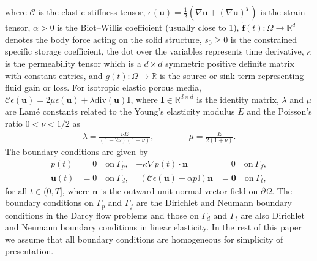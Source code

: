 \documentclass{amsart}
\begin{document}
where $\mathcal{C}$ is the elastic stiffness tensor, $\epsilon(\boldsymbol{u}) = \frac{1}{2}\left(\nabla \boldsymbol{u} + \left(\nabla \boldsymbol{u}\right)^{T}\right)$ is the strain tensor, $\alpha >0$ is the Biot--Willis coefficient (usually close to 1), $\tilde{\boldsymbol{f}}(t): \Omega \rightarrow \mathbb{R}^{d}$ denotes the body force acting on the solid structure, $s_{0} \ge 0$ is the constrained specific storage coefficient, the dot over the variables represents time derivative, $\kappa$ is the permeability tensor which is a $d\times d$ symmetric positive definite matrix with constant entries, and $g(t): \Omega \rightarrow \mathbb{R}$ is the source or sink term representing fluid gain or loss. For isotropic elastic porous media, $\boldsymbol{\mathcal{C}} \epsilon(\boldsymbol{u}) = 2\mu  \epsilon(\boldsymbol{u}) + \lambda \text{div}(\boldsymbol{u}) \boldsymbol{I}$,
where $\boldsymbol{I}\in \mathbb{R}^{d\times d}$ is the identity matrix, $\lambda$ and $\mu$ are Lam\'{e} constants related to the Young's elasticity modulus $E$ and the Poisson’s ratio $0<\nu<1/2$ as
\begin{align*}
	\lambda = \frac{\nu E}{(1-2\nu)(1+\nu)},\qquad \qquad \mu = \frac{E}{2(1+\nu)}.
\end{align*}
The boundary conditions are given by
\begin{align*}
	p(t) &=0 \quad \text{on} \ \Gamma_p, & -\kappa \nabla p(t) \cdot \boldsymbol{n}  &= 0 \quad \text{on} \ \Gamma_{f},
    \\
	\boldsymbol{u}(t) &=0 \quad \text{on} \ \Gamma_d, & \ \ (\mathcal{C} \epsilon(\boldsymbol{u}) - \alpha p \mathbb{I}) \boldsymbol{n} &= \boldsymbol{0} \quad \text{on} \ \Gamma_t,
\end{align*}
for all $t \in (0,T]$, where $\boldsymbol{n}$ is the outward unit normal vector field on $\partial \Omega$. The boundary conditions on $\Gamma_p$ and $\Gamma_{f}$ are the Dirichlet and Neumann boundary conditions in the Darcy flow problems and those on $\Gamma_d$ and $\Gamma_t$ are also Dirichlet and Neumann boundary conditions in linear elasticity. In the rest of this paper we assume that all boundary conditions are homogeneous for simplicity of presentation.
\end{document}
